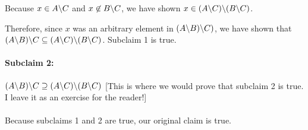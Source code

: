 \documentclass[12pt]{article}
\begin{document}
Because $x \in A\backslash C$ and $x \not \in B \backslash C$, we have shown $x \in (A \backslash C) \backslash (B \backslash C)$.

Therefore, since $x$ was an arbitrary element in $(A\backslash B)\backslash C)$, we have shown that $(A\backslash B)\backslash C \subseteq (A\backslash C)\backslash (B\backslash C)$.  Subclaim 1 is true.



\paragraph{Subclaim 2:} $(A\backslash B)\backslash C \supseteq (A\backslash C)\backslash (B\backslash C)$
[This is where we would prove that subclaim 2 is true. I leave it as an exercise for the reader!]

\paragraph{}
Because subclaims 1 and 2 are true, our original claim is true.
\end{document}

